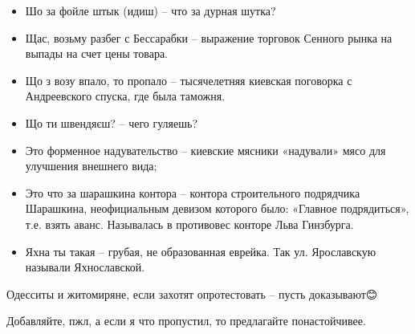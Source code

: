 \begin{itemize}
\item  Шо за фойле штык (идиш) – что за дурная шутка?
\item  Щас, возьму разбег с Бессарабки – выражение торговок Сенного рынка на выпады на счет цены товара.
\item  Що з возу впало, то пропало – тысячелетняя киевская поговорка с Андреевского спуска, где была таможня.
\item  Що ти швендяєш? – чего гуляешь?
\item  Это форменное надувательство – киевские мясники «надували» мясо для улучшения внешнего вида;
\item  Это что за шарашкина контора – контора строительного подрядчика Шарашкина, неофициальным девизом которого было: «Главное подрядиться», т.е. взять аванс. Называлась в противовес конторе Льва Гинзбурга.
\item  Яхна ты такая – грубая, не образованная еврейка. Так ул. Ярославскую называли Яхнославской.
\end{itemize}

Одесситы и житомиряне, если захотят опротестовать – пусть доказывают😊

Добавляйте, пжл, а если я что пропустил, то предлагайте понастойчивее.
